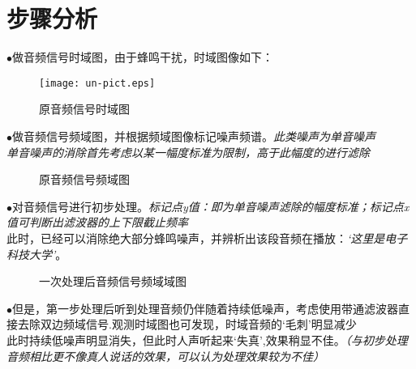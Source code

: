 \section{步骤分析}
$\bullet$做音频信号时域图，由于蜂鸣干扰，时域图像如下：
\begin{figure}[H]
    \centering
    \texttt{[image: un-pict.eps]}
    \caption{原音频信号时域图 }
\end{figure}
$\bullet$做音频信号频域图，并根据频域图像标记噪声频谱。\textit{此类噪声为单音噪声}\\\textit{单音噪声的消除首先考虑以某一幅度标准为限制，高于此幅度的进行滤除}
\begin{figure}[H]
    \centering
    \hfill 
    \caption{原音频信号频域图}
\end{figure}
\newpage
$\bullet$对音频信号进行初步处理。\textit{标记点y值：即为单音噪声滤除的幅度标准；标记点x值可判断出滤波器的上下限截止频率}\\
\indent 此时，已经可以消除绝大部分蜂鸣噪声，并辨析出该段音频在播放：\textit{‘这里是电子科技大学’}。

\begin{figure}[H]
    \centering
    \hfill 
    \caption{一次处理后音频信号频域域图}
\end{figure}
\newpage
$\bullet$但是，第一步处理后听到处理音频仍伴随着持续低噪声，考虑使用带通滤波器直接去除双边频域信号.观测时域图也可发现，时域音频的‘毛刺’明显减少\\
\indent 此时持续低噪声明显消失，但此时人声听起来‘失真’,效果稍显不佳。\textit{（与初步处理音频相比更不像真人说话的效果，可以认为处理效果较为不佳）}

